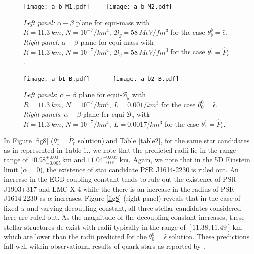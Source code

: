 \documentclass[]{aastex631}
\begin{document}
\begin{figure*}
    \centering
    \texttt{[image: a-b-M1.pdf]}~~~~
     \texttt{[image: a-b-M2.pdf]}
\caption{\textit{Left panel:} $\alpha-\beta$ plane for equi-mass with $R = 11.3~km, ~N = 10^{-7}/km^4,~\mathcal{B}_g=58\,MeV/fm^3$ for the case $\theta^0_0=\hat{\epsilon}$. \textit{Right panel:} $\alpha-\beta$ plane for equi-mass with $R = 11.3~km, ~N = 10^{-7}/km^4,~\mathcal{B}_g=58\,MeV/fm^3$ for the case $\theta^1_1=\hat{P}_r$.}
    \label{fig9}
\end{figure*}
\begin{figure*}
    \centering
    \texttt{[image: a-b1-B.pdf]}~~~~~~ \texttt{[image: a-b2-B.pdf]} 
    \caption{\textit{Left panels}: $\alpha-\beta$ plane for equi-$\mathcal{B}_g$ with $R = 11.3~km, ~N = 10^{-7}/km^4,~L=0.001/km^3$ for the case $\theta^0_0=\hat{\epsilon}$.  \textit{Right panels}: $\alpha-\beta$ plane for equi-$\mathcal{B}_g$ with $R = 11.3~km, ~N = 10^{-7}/km^4,~L=0.0017/km^3$ for the case $\theta^1_1=\hat{P}_r$. } 
    \label{fig10}
\end{figure*}
In Figure \ref{fig8} ($\theta^1_1=\hat{P}_r$ solution) and Table \ref{table2},  for the same star candidates as in represented in Table 1., we note that the predicted radii lie in the range range of $10.98^{+0.03}_{-0.005} ~ \text{km} $ and $11.04^{+0.005}_{-0.01} ~ \text{km}$. Again, we note that in the 5D Einstein limit ($\alpha = 0$), the existence of star candidate  PSR J1614-2230 is ruled out. An increase in the EGB coupling constant tends to rule out the existence of  PSR J1903+317 and LMC X-4 while the there is an increase in the radius of PSR J1614-2230 as $\alpha$ increases.  Figure \ref{fig8} (right panel) reveals that in the case of fixed $\alpha$ and varying decoupling constant, all three stellar candidates considered here are ruled out. As the magnitude of the decoupling constant increases, these stellar structures do exist with radii typically in the range of $[11.38, 11.49] ~ \text{km}$  which are lower than the radii predicted for the $\theta^0_0=\hat{\epsilon}$ solution. These predictions fall well within observational results of quark stars as reported by \citep{Ayan1,Ayan2}.
\end{document}
